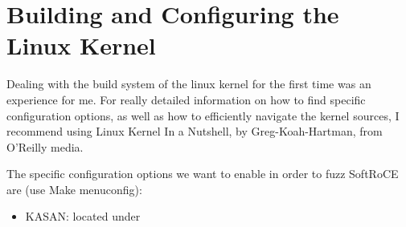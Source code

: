 \appendix 
\section{Building and Configuring the Linux Kernel}

Dealing with the build system of the linux kernel for the first time was an experience for me.
For really detailed information on how to find specific configuration options, as well as how
to efficiently navigate the kernel sources, I recommend using Linux Kernel In a Nutshell, by
Greg-Koah-Hartman, from O'Reilly media.

The specific configuration options we want to enable in order to fuzz SoftRoCE are (use Make menuconfig):

\begin{itemize}
    \item KASAN: located under
\end{itemize}
